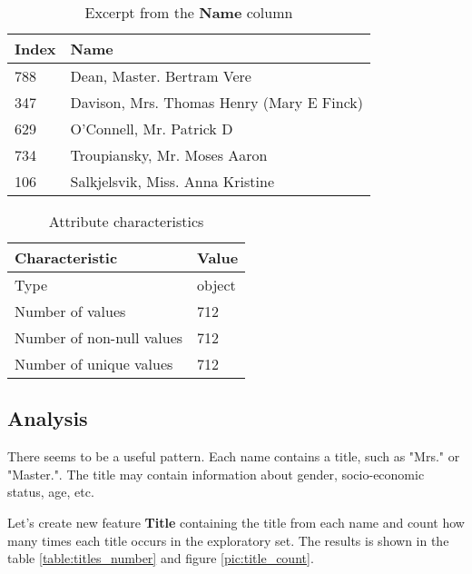 \begin{table}[!ht]
    \centering
    \caption{Excerpt from the \textbf{Name} column}
    \begin{tabular}{|l|l|}
        \hline
        \textbf{Index} & \textbf{Name}                             \\ \hline
        788            & Dean, Master. Bertram Vere                \\ \hline
        347            & Davison, Mrs. Thomas Henry (Mary E Finck) \\ \hline
        629            & O'Connell, Mr. Patrick D                  \\ \hline
        734            & Troupiansky, Mr. Moses Aaron              \\ \hline
        106            & Salkjelsvik, Miss. Anna Kristine          \\ \hline
    \end{tabular}
    \label{table:name_column_excerpt}
\end{table}

\begin{table}[!ht]
    \centering
    \caption{Attribute characteristics}
    \begin{tabular}{|l|l|}
        \hline
        \textbf{Characteristic}   & \textbf{Value} \\ \hline
        Type                      & object         \\ \hline
        Number of values          & 712            \\ \hline
        Number of non-null values & 712            \\ \hline
        Number of unique values   & 712            \\ \hline
    \end{tabular}
    \label{table:name_characteristics}
\end{table}

\subsection{Analysis}
There seems to be a useful pattern. Each name contains a title, such as 
"Mrs." or "Master.". The title may contain information about gender, 
socio-economic status, age, etc. 

Let's create new feature \textbf{Title} containing the title from each 
name and count how many times each title occurs in the exploratory set. 
The results is shown in the table \ref{table:titles_number} and figure 
\ref{pic:title_count}.

